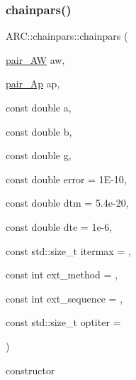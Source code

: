 \subsubsection{\texorpdfstring{chainpars()}{chainpars()}\hspace{0.1cm}{\footnotesize\ttfamily [2/2]}}
{\footnotesize\ttfamily A\+R\+C\+::chainpars\+::chainpars (\begin{DoxyParamCaption}\item[{\hyperlink{namespaceARC_a5c4308ca4a8d0e0ff59fdce30f00274c}{pair\+\_\+\+AW}}]{aw,  }\item[{\hyperlink{namespaceARC_a819446c4644b3a3af7ef11574d0b55e0}{pair\+\_\+\+Ap}}]{ap,  }\item[{const double}]{a,  }\item[{const double}]{b,  }\item[{const double}]{g,  }\item[{const double}]{error = {\ttfamily 1E-\/10},  }\item[{const double}]{dtm = {\ttfamily 5.4e-\/20},  }\item[{const double}]{dte = {\ttfamily 1e-\/6},  }\item[{const std\+::size\+\_\+t}]{itermax = {},  }\item[{const int}]{ext\+\_\+method = {},  }\item[{const int}]{ext\+\_\+sequence = {},  }\item[{const std\+::size\+\_\+t}]{optiter = {} }\end{DoxyParamCaption})\hspace{0.3cm}{\ttfamily [inline]}}



constructor 


